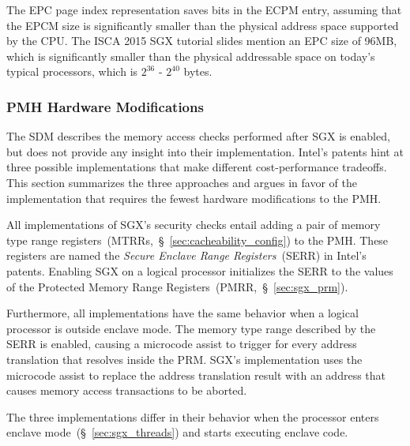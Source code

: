 
The EPC page index representation saves bits in the ECPM entry, assuming that
the EPCM size is significantly smaller than the physical address space
supported by the CPU. The ISCA 2015 SGX tutorial slides mention an EPC size of
96MB, which is significantly smaller than the physical addressable space on
today's typical processors, which is $2^{36}$ - $2^{40}$ bytes.


\subsubsection{PMH Hardware Modifications}
\label{sec:sgx_pmh_hardware}


The SDM describes the memory access checks performed after SGX is enabled, but
does not provide any insight into their implementation. Intel's patents hint at
three possible implementations that make different cost-performance tradeoffs.
This section summarizes the three approaches and argues in favor of the
implementation that requires the fewest hardware modifications to the PMH.

All implementations of SGX's security checks entail adding a pair of memory
type range registers~(MTRRs,~\S~\ref{sec:cacheability_config}) to the PMH.
These registers are named the \textit{Secure Enclave Range Registers}~(SERR)
in Intel's patents.  Enabling SGX on a logical processor initializes the SERR
to the values of the Protected Memory Range
Registers~(PMRR,~\S~\ref{sec:sgx_prm}).

Furthermore, all implementations have the same behavior when a logical
processor is outside enclave mode. The memory type range described by the SERR
is enabled, causing a microcode assist to trigger for every address translation
that resolves inside the PRM. SGX's implementation uses the microcode assist to
replace the address translation result with an address that causes memory
access transactions to be aborted.

The three implementations differ in their behavior when the processor enters
enclave mode~(\S~\ref{sec:sgx_threads}) and starts executing enclave code.

